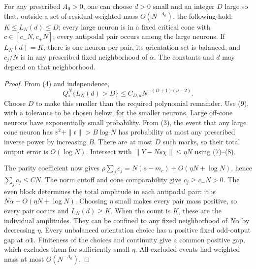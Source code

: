 \documentclass[11pt]{article}
\begin{document}
\begin{lemma}\label{lem:coarse}
For any prescribed $A_0>0$, one can choose $d>0$ small and an integer
$D$ large so that, outside a set of residual weighted mass $O(N^{-A_0})$,
the following hold: $K\le L_N(d)\le D$; every large neuron is in a fixed
critical cone with $c\in[c_-N,c_+N]$; every antipodal pair occurs among
the large neurons. If $L_N(d)=K$, there is one neuron per pair, its
orientation set is balanced, and $c_j/N$ is in any prescribed fixed
neighborhood of $\alpha$. The constants and $d$ may depend on that
neighborhood.
\end{lemma}
\begin{proof}
From (4) and independence,
\[
 Q_*^N\{L_N(d)>D\}\le C_{D,d}N^{-(D+1)(\nu-2)}.
\]
Choose $D$ to make this smaller than the required polynomial remainder.
Use (9), with a tolerance to be chosen below, for the smaller neurons.
Large off-cone neurons have exponentially small probability. From (3),
the event that any large cone neuron has $v^2+\|t\|>B\log N$ has
probability at most any prescribed inverse power by increasing $B$.
There are at most $D$ such marks, so their total output error is
$O(\log N)$. Intersect with $\|Y-Ns\chi\|\le\eta N$ using (7)--(8).

The parity coefficient now gives
$\rho\sum_jc_j=N(s-m_c)+O(\eta N+\log N)$, hence $\sum_jc_j\le CN$.
The norm cutoff and cone comparability give $c_j\ge c_-N>0$.
The even block determines the total amplitude in each antipodal pair:
it is $N\alpha+O(\eta N+\log N)$. Choosing $\eta$ small makes every
pair mass positive, so every pair occurs and $L_N(d)\ge K$.
When the count is $K$, these are the individual amplitudes. They can
be confined to any fixed neighborhood of $N\alpha$ by decreasing
$\eta$. Every unbalanced orientation choice has a positive fixed
odd-output gap at $\alpha\mathbf1$. Finiteness of the choices and
continuity give a common positive gap, which excludes them for sufficiently
small $\eta$. All excluded events had weighted mass at most $O(N^{-A_0})$.
\end{proof}
\end{document}
